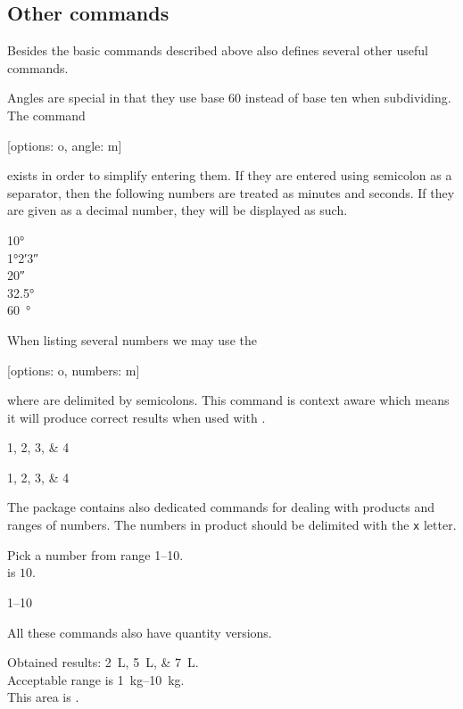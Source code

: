 \subsection{Other  commands}

Besides the basic commands described above  also defines several
other useful commands.

Angles are special in that they use base $60$ instead of base ten when
subdividing. The command
\begin{lscommand}
  [options: o, angle: m]
\end{lscommand}
exists in order to simplify entering them. If they are entered using semicolon
as a separator, then the following numbers are treated as minutes and seconds.
If they are given as a decimal number, they will be displayed as such.
\begin{example}
\ang{10} \\
\ang{1;2;3} \\
\ang{;;20} \\
\ang{32.5} \\
\qty{60}{\degree}
\end{example}

When listing several numbers we may use the
\begin{lscommand}
  [options: o, numbers: m]
\end{lscommand}
where  are delimited by semicolons. This command is context aware
which means it will produce correct results when used with .
\begin{example}
\numlist{1;2;3;4}

\begin{german}
  \numlist{1;2;3;4}
\end{german}
\end{example}

The package contains also dedicated commands for dealing with products and
ranges of numbers. The numbers in product should be delimited with the \verb|x|
letter.
\begin{example}
Pick a number from
range \numrange{1}{10}. \\
 is $10$. \\
\begin{german}
  \numrange{1}{10}
\end{german}
\end{example}

All these commands also have quantity versions.
\begin{example}
Obtained results:
\qtylist{2;5;7}{\L}.\\
Acceptable range is
\qtyrange{1}{10}{\kg}. \\
This area is
.
\end{example}

